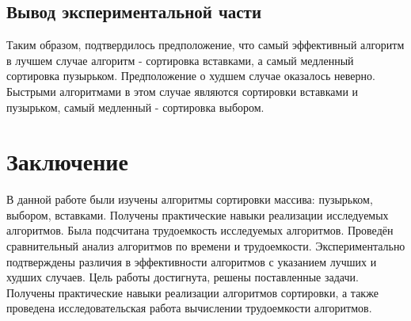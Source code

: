 \section{Вывод экспериментальной части}\label{experimentresult}

Таким образом, подтвердилось предположение, что самый эффективный алгоритм в лучшем случае алгоритм - сортировка вставками, а самый 
медленный сортировка пузырьком. Предположение о худшем случае оказалось неверно. Быстрыми алгоритмами в этом случае являются сортировки 
вставками и пузырьком, самый медленный - сортировка выбором.

\chapter{Заключение}\label{exit}

В данной работе были изучены алгоритмы сортировки массива: пузырьком, выбором, вставками. 
Получены практические навыки реализации исследуемых алгоритмов. Была подсчитана трудоемкость исследуемых алгоритмов. 
Проведён сравнительный анализ алгоритмов по времени и трудоемкости. 
Экспериментально подтверждены различия в эффективности алгоритмов с указанием лучших и худших случаев. 
Цель работы достигнута, решены поставленные задачи. 
Получены практические навыки реализации алгоритмов сортировки, а также проведена исследовательская работа 
вычислении трудоемкости алгоритмов.

